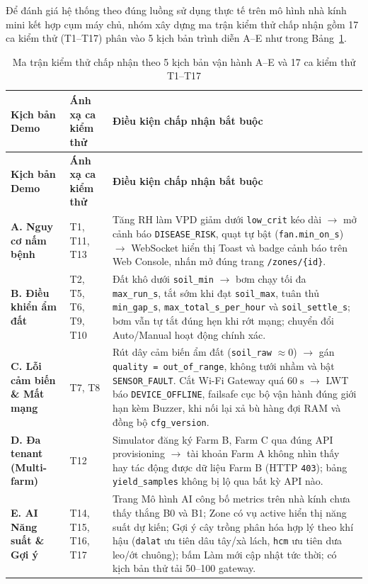 Để đánh giá hệ thống theo đúng luồng sử dụng thực tế trên mô hình nhà kính mini kết hợp cụm máy chủ, nhóm xây dựng ma trận kiểm thử chấp nhận gồm 17 ca kiểm thử (T1--T17) phân vào 5 kịch bản trình diễn A--E như trong Bảng~\ref{tab:acceptance-matrix}.

\begingroup
\scriptsize
\sloppy
\setlength{\tabcolsep}{3pt}
\renewcommand{\arraystretch}{1.12}
\begin{longtable}{|>{\raggedright\arraybackslash}p{}|>{\centering\arraybackslash}p{}|>{\raggedright\arraybackslash}p{}|}
\caption{Ma trận kiểm thử chấp nhận theo 5 kịch bản vận hành A--E và 17 ca kiểm thử T1--T17}\label{tab:acceptance-matrix}\\
\hline
\textbf{Kịch bản Demo} & \textbf{Ánh xạ ca kiểm thử} & \textbf{Điều kiện chấp nhận bắt buộc} \\
\hline
\endfirsthead
\hline
\textbf{Kịch bản Demo} & \textbf{Ánh xạ ca kiểm thử} & \textbf{Điều kiện chấp nhận bắt buộc} \\
\hline
\endhead
\textbf{A. Nguy cơ nấm bệnh} & T1, T11, T13 & Tăng RH làm VPD giảm dưới \texttt{low\_crit} kéo dài \(\rightarrow\) mở cảnh báo \texttt{DISEASE\_RISK}, quạt tự bật (\texttt{fan.min\_on\_s}) \(\rightarrow\) WebSocket hiển thị Toast và badge cảnh báo trên Web Console, nhấn mở đúng trang \texttt{/zones/\{id\}}. \\ \hline
\textbf{B. Điều khiển ẩm đất} & T2, T5, T6, T9, T10 & Đất khô dưới \texttt{soil\_min} \(\rightarrow\) bơm chạy tối đa \texttt{max\_run\_s}, tắt sớm khi đạt \texttt{soil\_max}, tuân thủ \texttt{min\_gap\_s}, \texttt{max\_total\_s\_per\_hour} và \texttt{soil\_settle\_s}; bơm vẫn tự tắt đúng hẹn khi rớt mạng; chuyển đổi Auto/Manual hoạt động chính xác. \\ \hline
\textbf{C. Lỗi cảm biến \& Mất mạng} & T7, T8 & Rút dây cảm biến ẩm đất (\texttt{soil\_raw} \(\approx 0\)) \(\rightarrow\) gán \texttt{quality = out\_of\_range}, không tưới nhầm và bật \texttt{SENSOR\_FAULT}. Cắt Wi-Fi Gateway quá \(60\;\text{s}\) \(\rightarrow\) LWT báo \texttt{DEVICE\_OFFLINE}, failsafe cục bộ vận hành đúng giới hạn kèm Buzzer, khi nối lại xả bù hàng đợi RAM và đồng bộ \texttt{cfg\_version}. \\ \hline
\textbf{D. Đa tenant (Multi-farm)} & T12 & Simulator đăng ký Farm B, Farm C qua đúng API provisioning \(\rightarrow\) tài khoản Farm A không nhìn thấy hay tác động được dữ liệu Farm B (HTTP \texttt{403}); bảng \texttt{yield\_samples} không bị lộ qua bất kỳ API nào. \\ \hline
\textbf{E. AI Năng suất \& Gợi ý} & T14, T15, T16, T17 & Trang Mô hình AI công bố metrics trên nhà kính chưa thấy thắng B0 và B1; Zone có vụ active hiển thị năng suất dự kiến; Gợi ý cây trồng phân hóa hợp lý theo khí hậu (\texttt{dalat} ưu tiên dâu tây/xà lách, \texttt{hcm} ưu tiên dưa leo/ớt chuông); bấm Làm mới cập nhật tức thời; có kịch bản thử tải 50--100 gateway. \\ \hline
\end{longtable}
\endgroup

